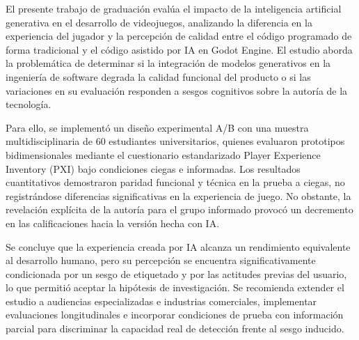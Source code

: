 El presente trabajo de graduación evalúa el impacto de la inteligencia artificial generativa en el desarrollo de videojuegos, analizando la diferencia en la experiencia del jugador y la percepción de calidad entre el código programado de forma tradicional y el código asistido por IA en Godot Engine. El estudio aborda la problemática de determinar si la integración de modelos generativos en la ingeniería de software degrada la calidad funcional del producto o si las variaciones en su evaluación responden a sesgos cognitivos sobre la autoría de la tecnología.

Para ello, se implementó un diseño experimental A/B con una muestra multidisciplinaria de 60 estudiantes universitarios, quienes evaluaron prototipos bidimensionales mediante el cuestionario estandarizado Player Experience Inventory (PXI) bajo condiciones ciegas e informadas. Los resultados cuantitativos demostraron paridad funcional y técnica en la prueba a ciegas, no registrándose diferencias significativas en la experiencia de juego. No obstante, la revelación explícita de la autoría para el grupo informado provocó un decremento en las calificaciones hacia la versión hecha con IA.

Se concluye que la experiencia creada por IA alcanza un rendimiento equivalente al desarrollo humano, pero su percepción se encuentra significativamente condicionada por un sesgo de etiquetado y por las actitudes previas del usuario, lo que permitió aceptar la hipótesis de investigación. Se recomienda extender el estudio a audiencias especializadas e industrias comerciales, implementar evaluaciones longitudinales e incorporar condiciones de prueba con información parcial para discriminar la capacidad real de detección frente al sesgo inducido. 